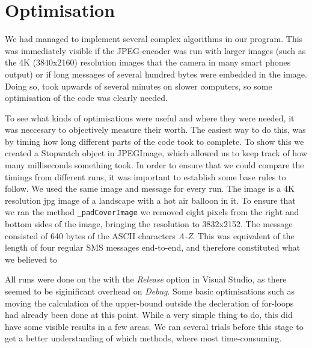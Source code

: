 \section{Optimisation}
We had managed to implement several complex algorithms in our program. 
This was immediately visible if the JPEG-encoder was run with larger images (such as the 4K (3840x2160) resolution images that the camera in many smart phones output) or if long messages of several hundred bytes were embedded in the image.
Doing so, took upwards of several minutes on slower computers, so some optimisation of the code was clearly needed.

To see what kinds of optimisations were useful and where they were needed, it was neccesary to objectively measure their worth.
The easiest way to do this, was by timing how long different parts of the code took to complete.
To show this we created a Stopwatch object in JPEGImage, which allowed us to keep track of how many milliseconds something took.
In order to ensure that we could compare the timings from different runs, it was important to establish some base rules to follow.
We used the same image and message for every run. 
The image is a 4K resolution jpg image of a landscape with a hot air balloon in it. 
To ensure that we ran the method \lstinline|_padCoverImage| we removed eight pixels from the right and bottom sides of the image, bringing the resolution to 3832x2152.
The message consisted of 640 bytes of the ASCII characters \textit{A-Z}.
This was equivalent of the length of four regular SMS messages end-to-end, and therefore constituted what we believed to

All runs were done on the with the \textit{Release} option in Visual Studio, as there seemed to be siginificant overhead on \textit{Debug}.
Some basic optimisations such as moving the calculation of the upper-bound outside the decleration of for-loops had already been done at this point.
While a very simple thing to do, this did have some visible results in a few areas.
We ran several trials before this stage to get a better understanding of which methods, where most time-consuming.

